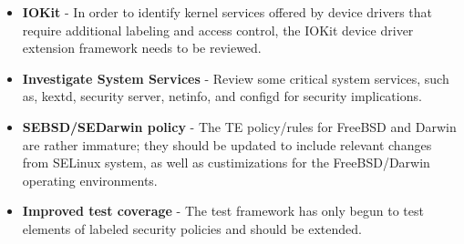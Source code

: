\begin{itemize}
\item {\bf IOKit} - In order to identify kernel services offered by
device drivers that require additional labeling and access control,
the IOKit device driver extension framework needs to be reviewed.

\item {\bf Investigate System Services} - Review some critical system
services, such as, kextd, security server, netinfo, and configd for
security implications.

\item {\bf SEBSD/SEDarwin policy} - The TE policy/rules for FreeBSD
and Darwin are rather immature; they should be updated to include
relevant changes from SELinux system, as well as custimizations for
the FreeBSD/Darwin operating environments.

\item {\bf Improved test coverage} - The test framework has only begun
to test elements of labeled security policies and should be extended.

\end{itemize}
